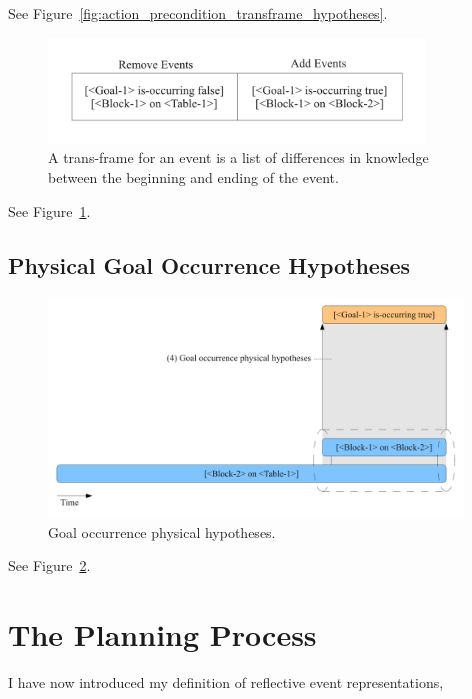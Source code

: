 See Figure~\ref{fig:action_precondition_transframe_hypotheses}.

\begin{figure}[bth]
  \center
  \includegraphics[width=10cm]{gfx/transframe}
  \caption[A trans-frame for an event]{A trans-frame for an event is a
    list of differences in knowledge between the beginning and ending
    of the event.}
  \label{fig:transframe}
\end{figure}

See Figure~\ref{fig:transframe}.



\subsection{Physical Goal Occurrence Hypotheses}

\begin{figure}[bth]
  \center
  \includegraphics[width=11cm]{gfx/learning_to_plan-4-goal_occurrence_physical_hypotheses}
  \caption[Goal occurrence physical hypotheses]{Goal occurrence physical hypotheses.}
  \label{fig:goal_occurrence_physical_hypotheses}
\end{figure}

See Figure~\ref{fig:goal_occurrence_physical_hypotheses}.



\section{The Planning Process}

I have now introduced my definition of reflective event representations, 

